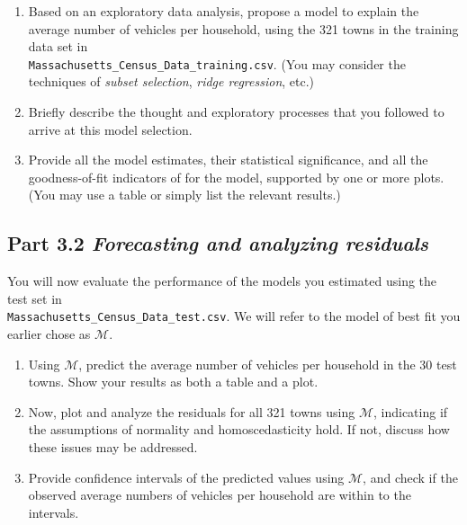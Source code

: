 \documentclass[11pt,twoside]{article}
\newcommand{\pts}[1]{\marginpar{ \small\hspace{0pt} \textit{[#1]} } }
\newcommand{\?}{\stackrel{?}{=}}
\begin{document}
  \begin{enumerate}[\bf(a)]
  \item  Based on an exploratory data analysis,\pts{3}
    propose a model to explain the average number of vehicles per household, using the 321 towns in the training data set in\\ \texttt{Massachusetts\_Census\_Data\_training.csv}. (You may consider the techniques of \textit{subset selection}, \textit{ridge regression}, etc.)
  \item  Briefly describe the thought \pts{3} and exploratory processes that you followed to arrive at this model selection.
  \item Provide all the model estimates,\pts{3} their statistical significance, and all the goodness-of-fit indicators of for the  model, supported by one or more plots.
    (You may use a table or simply list the relevant results.)

  \end{enumerate}

 

\subsection*{Part 3.2 {\it Forecasting and analyzing residuals}}
You will now evaluate the performance of the models you estimated using the test set in\\ \texttt{Massachusetts\_Census\_Data\_test.csv}.
We will refer to the model of best fit you earlier chose as $\mathscr{M}$.

\begin{enumerate}[\bf(a)]
\item Using $\mathcal{M}$, predict the \pts{3} average number of vehicles per household in the 30 test towns. Show your results as both a table and a plot. 
\item Now, plot and analyze the residuals for all 321 towns using $\mathscr{M}$, \pts{3} indicating if the assumptions of normality and homoscedasticity hold. If not, discuss how these issues may be addressed.
\item Provide confidence intervals of the predicted values using $\mathscr{M}$, \pts{3} and check if the observed average numbers of vehicles per household are within to the intervals.

\end{enumerate}
\end{document}
